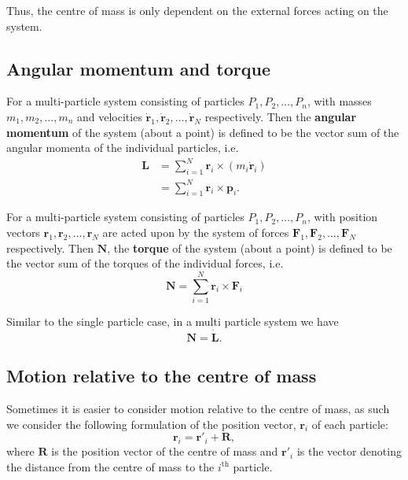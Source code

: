 \documentclass[12pt, a4paper]{article}
\begin{document}
\begin{mdnote}
    Thus, the centre of mass is only dependent on the external forces acting on the system.
\end{mdnote}

\subsection{Angular momentum and torque}

\begin{definition}
    For a multi-particle system consisting of particles \(P_1,P_2,\ldots, P_n\), with masses \(m_1,m_2,\ldots, m_n\) and velocities \(\dot{\bm{r}}_1,\dot{\bm{r}}_2,\ldots,\dot{\bm{r}}_N\) respectively. Then the \textbf{angular momentum} of the system (about a point) is defined to be the vector sum of the angular momenta of the individual particles, i.e.
    \[\begin{aligned}
        \bm{L} &= \sum_{i=1}^N \bm{r}_i \times (m_i \dot{\bm{r}}_i ) \\
            &= \sum_{i=1}^N \bm{r}_i \times \bm{p}_i .
    \end{aligned}\]
\end{definition}

\begin{definition}
    For a multi-particle system consisting of particles \(P_1,P_2,\ldots, P_n\), with position vectors \(\bm{r}_1, \bm{r}_2, \ldots, \bm{r}_N\) are acted upon by the system of forces \(\bm{F}_1,\bm{F}_2,\ldots, \bm{F}_N\) respectively. Then \(\bm{N}\), the \textbf{torque} of the system (about a point) is defined to be the vector sum of the torques of the individual forces, i.e.
    \[\bm{N}=  \sum_{i=1}^N \bm{r}_i \times \bm{F}_i\]
\end{definition}

\begin{theorem}
    Similar to the single particle case, in a multi particle system we have
    \[\bm{N}=\dot{\bm{L}}.\]
\end{theorem}

\subsection{Motion relative to the centre of mass}

Sometimes it is easier to consider motion relative to the centre of mass, as such we consider the following formulation of the position vector, \(\bm{r}_i\) of each particle:
\[\bm{r}_i=\bm{r'}_i+\bm{R},\]
where \(\bm{R}\) is the position vector of the centre of mass and \(\bm{r'}_i\) is the vector denoting the distance from the centre of mass to the \(i^{\text{th}}\) particle.
\end{document}
